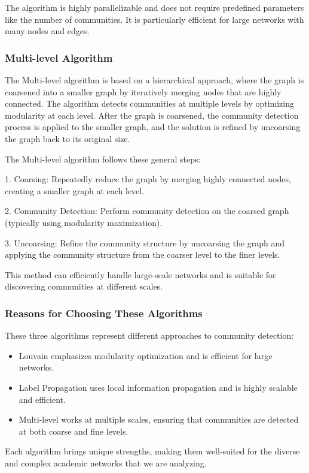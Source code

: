 \documentclass[11pt]{article}
\begin{document}
The algorithm is highly parallelizable and does not require predefined parameters like the number of communities. It is particularly efficient for large networks with many nodes and edges.

\subsubsection{Multi-level Algorithm}
The Multi-level algorithm is based on a hierarchical approach, where the graph is coarsened into a smaller graph by iteratively merging nodes that are highly connected. The algorithm detects communities at multiple levels by optimizing modularity at each level. After the graph is coarsened, the community detection process is applied to the smaller graph, and the solution is refined by uncoarsing the graph back to its original size.

The Multi-level algorithm follows these general steps:

1. Coarsing: Repeatedly reduce the graph by merging highly connected nodes, creating a smaller graph at each level.

2. Community Detection: Perform community detection on the coarsed graph (typically using modularity maximization).

3. Uncoarsing: Refine the community structure by uncoarsing the graph and applying the community structure from the coarser level to the finer levels.

This method can efficiently handle large-scale networks and is suitable for discovering communities at different scales.

\subsubsection{Reasons for Choosing These Algorithms}
These three algorithms represent different approaches to community detection:
\begin{itemize}
	\item Louvain emphasizes modularity optimization and is efficient for large networks.
	\item Label Propagation uses local information propagation and is highly scalable and efficient.
	\item Multi-level works at multiple scales, ensuring that communities are detected at both coarse and fine levels.
\end{itemize}

Each algorithm brings unique strengths, making them well-suited for the diverse and complex academic networks that we are analyzing.
\end{document}

